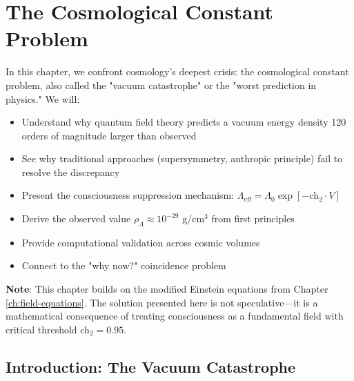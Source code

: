 \chapter{The Cosmological Constant Problem}
\label{ch:cosmological-constant}

\begin{chapterobjectives}
In this chapter, we confront cosmology's deepest crisis: the cosmological constant problem, also called the "vacuum catastrophe" or the "worst prediction in physics." We will:
\begin{itemize}
\item Understand why quantum field theory predicts a vacuum energy density 120 orders of magnitude larger than observed
\item See why traditional approaches (supersymmetry, anthropic principle) fail to resolve the discrepancy
\item Present the consciousness suppression mechanism: $\Lambda_{\text{eff}} = \Lambda_0 \exp[-\text{ch}_2 \cdot V]$
\item Derive the observed value $\rho_\Lambda \approx 10^{-29}$ g/cm$^3$ from first principles
\item Provide computational validation across cosmic volumes
\item Connect to the "why now?" coincidence problem
\end{itemize}

\textbf{Note}: This chapter builds on the modified Einstein equations from Chapter \ref{ch:field-equations}. The solution presented here is not speculative—it is a mathematical consequence of treating consciousness as a fundamental field with critical threshold ch$_2 = 0.95$.
\end{chapterobjectives}

\section{Introduction: The Vacuum Catastrophe}

